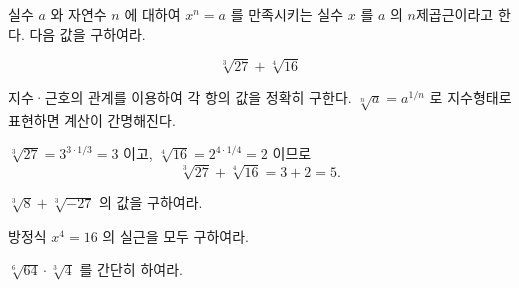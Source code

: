 \documentclass[11pt,a4paper]{article}
\begin{document}
\clearpage


\begin{dmproblem}
실수 $a$ 와 자연수 $n$ 에 대하여 $x^n = a$ 를 만족시키는 실수 $x$ 를 $a$ 의
$n$제곱근이라고 한다. 다음 값을 구하여라.

$$\sqrt[3]{27} + \sqrt[4]{16}$$
\end{dmproblem}

\begin{dmapproach}
지수·근호의 관계를 이용하여 각 항의 값을 정확히 구한다. $\sqrt[n]{a} = a^{1/n}$
로 지수형태로 표현하면 계산이 간명해진다.
\end{dmapproach}

\begin{dmsolution}
$\sqrt[3]{27} = 3^{3 \cdot 1/3} = 3$ 이고, $\sqrt[4]{16} = 2^{4 \cdot 1/4} = 2$
이므로 $$\sqrt[3]{27} + \sqrt[4]{16} = 3 + 2 = 5.$$
\end{dmsolution}


\dmyujaebanner

\begin{dmyujaelist}

$\sqrt[3]{8} + \sqrt[3]{-27}$ 의 값을 구하여라.

방정식 $x^4 = 16$ 의 실근을 모두 구하여라.

$\sqrt[6]{64} \cdot \sqrt[3]{4}$ 를 간단히 하여라.

\end{dmyujaelist}

\clearpage



\end{document}
